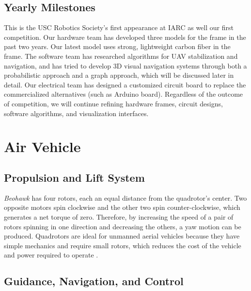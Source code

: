\documentclass[12pt, letterpaper]{article}
\begin{document}
\subsection{Yearly Milestones}

This is the USC Robotics Society's first appearance at IARC as well our first competition. Our hardware team has developed three models for the frame in the past two years. Our latest model uses strong, lightweight carbon fiber in the frame. The software team has researched algorithms for UAV stabilization and navigation, and has tried to develop 3D visual navigation systems through both a probabilistic approach and a graph approach, which will be discussed later in detail. Our electrical team has designed a customized circuit board to replace the commercialized alternatives (such as Arduino board). Regardless of the outcome of competition, we will continue refining hardware frames, circuit designs, software algorithms, and visualization interfaces.


\section{Air Vehicle}

\subsection{Propulsion and Lift System}
\emph{Beohawk} has four rotors, each an equal distance from the quadrotor's center.  Two opposite motors spin clockwise and the other two spin counter-clockwise, which generates a net torque of zero.  Therefore, by increasing the speed of a pair of rotors spinning in one direction and decreasing the others, a yaw motion can be produced. Quadrotors are ideal for unmanned aerial vehicles because they have simple mechanics and require small rotors, which reduces the cost of the vehicle and power required to operate \cite{bib:quadrotor}.

\subsection{Guidance, Navigation, and Control}
\end{document}
